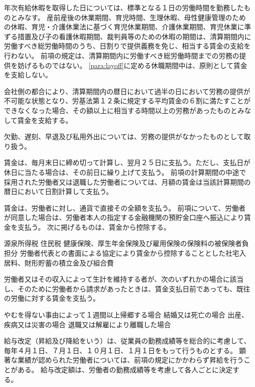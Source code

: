\documentclass[10pt,a4paper]{jsarticle}
\begin{document}
年次有給休暇を取得した日については、標準となる１日の労働時間を勤務したものとみなす。
\term
産前産後の休業期間、育児時間、生理休暇、母性健康管理のための休暇、育児・介護休業法に基づく育児休業期間、介護休業期間、育児休業に準ずる措置及び子の看護休暇期間、裁判員等のための休暇の期間は、清算期間内に労働すべき総労働時間のうち、日割りで提供義務を免じ、相当する賃金の支給を行わない。 
\term
前項の規定は、清算期間内に労働すべき総労働時間までの労務の提供を妨げるものではない。
\term
\ref{para:layoff}に定める休職期間中は、原則として賃金を支給しない。

会社側の都合により、清算期間内の暦日において過半の日において労務の提供が不可能な状態となり、労基法第１２条に規定する平均賃金の６割に満たすことができなくなった場合、その額以上に相当する時間以上の労務があったものとみなして賃金を支給する。

欠勤、遅刻、早退及び私用外出については、労務の提供がなかったものとして取り扱う。

賃金は、毎月末日に締め切って計算し、翌月２５日に支払う。ただし、支払日が休日に当たる場合は、その前日に繰り上げて支払う。
\term
前項の計算期間の中途で採用された労働者又は退職した労働者については、月額の賃金は当該計算期間の暦日において日割計算して支払う。

賃金は、労働者に対し、通貨で直接その全額を支払う。
\term
前項について、労働者が同意した場合は、労働者本人の指定する金融機関の預貯金口座へ振込により賃金を支払う。
\term
次に掲げるものは、賃金から控除する。
\begin{enumerate}
    \itm 源泉所得税
    \itm 住民税
    \itm 健康保険、厚生年金保険及び雇用保険の保険料の被保険者負担分
    \itm 労働者代表との書面による協定により賃金から控除することとした社宅入居料、財形貯蓄の積立金及び組合費
\end{enumerate}

労働者又はその収入によって生計を維持する者が、次のいずれかの場合に該当し、そのために労働者から請求があったときは、賃金支払日前であっても、既往の労働に対する賃金を支払う。
\begin{enumerate}
    \itm やむを得ない事由によって１週間以上帰郷する場合
    \itm 結婚又は死亡の場合
    \itm 出産、疾病又は災害の場合
    \itm 退職又は解雇により離職した場合
\end{enumerate}

給与改定（昇給及び降給をいう）は、従業員の勤務成績等を総合的に考慮して、毎年４月１日、７月１日、１０月１日、１月１日をもって行うものとする。
\term
顕著な業績が認められた労働者については、前項の規定にかかわらず昇給を行うことがある。
\term
給与改定額は、労働者の勤務成績等を考慮して各人ごとに決定する。
\end{document}
